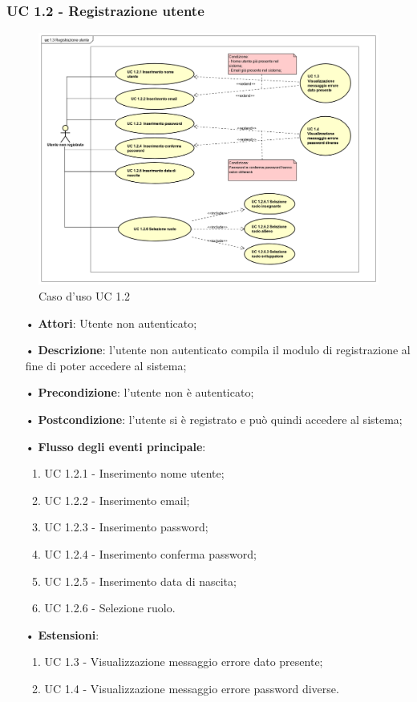 \subsubsection{UC 1.2 - Registrazione utente}
\begin{figure}[H]
	\centering
	\includegraphics[width=17cm]{img/UC12.png} 
	\caption{Caso d'uso UC 1.2}\label{fig:12}
\end{figure}
\begin{itemize}
	\item[•]\textbf{Attori}: Utente non autenticato;
	\item[•]\textbf{Descrizione}: l'utente non autenticato compila il modulo di registrazione al fine di poter accedere al sistema;
	\item[•]\textbf{Precondizione}: l'utente non è autenticato;
	\item[•]\textbf{Postcondizione}: l'utente si è registrato e può quindi accedere al sistema;
	\item[•]\textbf{Flusso degli eventi principale}:
	\begin{enumerate}
		\item UC 1.2.1 - Inserimento nome utente;
		\item UC 1.2.2 - Inserimento email;
		\item UC 1.2.3 - Inserimento password;
		\item UC 1.2.4 - Inserimento conferma password;
		\item UC 1.2.5 - Inserimento data di nascita;
		\item UC 1.2.6 - Selezione ruolo.
	\end{enumerate}
	\item[•]\textbf{Estensioni}:
	\begin{enumerate}
		\item UC 1.3 - Visualizzazione messaggio errore dato presente;
		\item UC 1.4 - Visualizzazione messaggio errore password diverse.
	\end{enumerate}
\end{itemize}

